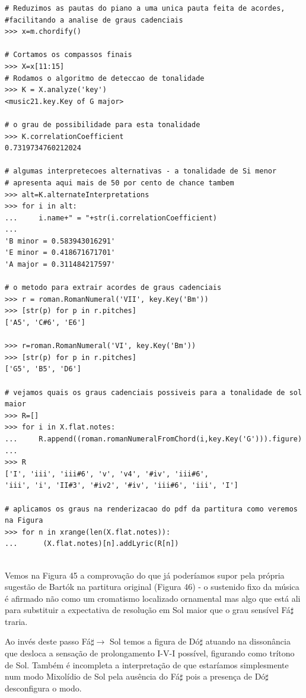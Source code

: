 \documentclass[
	12pt,				%
	openright,			%
	twoside,			%
	a4paper,			%
	english,			%
	french,				%
	spanish,			%
	brazil				%
	]{abntex2}
\begin{document}
\begin{lstlisting}
# Reduzimos as pautas do piano a uma unica pauta feita de acordes,
#facilitando a analise de graus cadenciais
>>> x=m.chordify()

# Cortamos os compassos finais
>>> X=x[11:15]
# Rodamos o algoritmo de deteccao de tonalidade
>>> K = X.analyze('key')
<music21.key.Key of G major>

# o grau de possibilidade para esta tonalidade
>>> K.correlationCoefficient
0.7319734760212024

# algumas interpretecoes alternativas - a tonalidade de Si menor
# apresenta aqui mais de 50 por cento de chance tambem
>>> alt=K.alternateInterpretations
>>> for i in alt:
...     i.name+" = "+str(i.correlationCoefficient)      
... 
'B minor = 0.583943016291'
'E minor = 0.418671671701'
'A major = 0.311484217597'

# o metodo para extrair acordes de graus cadenciais
>>> r = roman.RomanNumeral('VII', key.Key('Bm'))
>>> [str(p) for p in r.pitches]
['A5', 'C#6', 'E6']

>>> r=roman.RomanNumeral('VI', key.Key('Bm'))
>>> [str(p) for p in r.pitches]
['G5', 'B5', 'D6']

# vejamos quais os graus cadenciais possiveis para a tonalidade de sol maior
>>> R=[]
>>> for i in X.flat.notes:
...     R.append((roman.romanNumeralFromChord(i,key.Key('G'))).figure)
... 
>>> R
['I', 'iii', 'iii#6', 'v', 'v4', '#iv', 'iii#6', 
'iii', 'i', 'II#3', '#iv2', '#iv', 'iii#6', 'iii', 'I']

# aplicamos os graus na renderizacao do pdf da partitura como veremos na Figura
>>> for n in xrange(len(X.flat.notes)):
...      (X.flat.notes)[n].addLyric(R[n])


\end{lstlisting}

Vemos na Figura 45 a comprovação do que já poderíamos supor pela própria sugestão de Bartók na partitura original (Figura 46) - o sustenido fixo da música é afirmado não como um cromatismo localizado ornamental mas algo que está ali para substituir a expectativa de resolução em Sol maior que o grau sensível Fá$\sharp$ traria. 

Ao invés deste passo Fá$\sharp \rightarrow $ Sol temos a figura de Dó$\sharp$ atuando na dissonância que desloca a sensação de prolongamento I-V-I possível, figurando como trítono de Sol. Também é incompleta a interpretação de que estaríamos simplesmente num modo Mixolídio de Sol pela ausência do Fá$\sharp$ pois a presença de Dó$\sharp$ desconfigura o modo.
\end{document}
